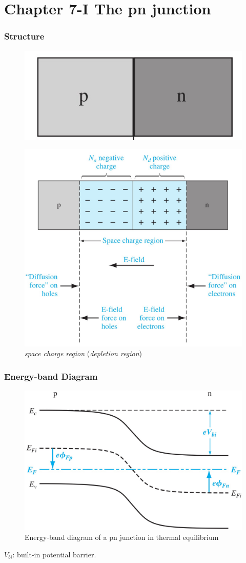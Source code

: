 \documentclass{beamer}
\begin{document}
\section{Chapter 7-I The pn junction}
    \begin{frame} \frametitle{Structure}
        \begin{figure}
            \centering
            \includegraphics[width=0.3\linewidth]{pn-junction.jpg}
            \label{fig:pn-junction.jpg}
        \end{figure}
        \begin{figure}
            \centering
            \includegraphics[width=0.6\linewidth]{Space-charge-region.jpg}
            \caption{\textit{space charge region} (\textit{depletion region})}
            \label{fig:Space-charge-region.jpg}
        \end{figure}
    \end{frame}

    \begin{frame} \frametitle{Energy-band Diagram}
        \begin{figure}[H]
            \centering
            \includegraphics[width=0.6\linewidth]{pn-junction-energy-band-diagram.jpg}
            \caption{Energy-band diagram of a pn junction in thermal equilibrium}
            \label{fig:pn-junction-energy-band-diagram.jpg}
        \end{figure}
        $V_{bi}$: built-in potential barrier.
    \end{frame}
\end{document}
